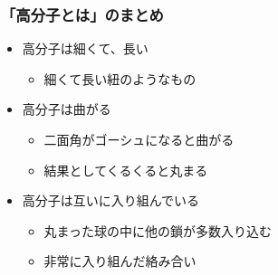\documentclass[unicode,12pt]{beamer}%
\begin{document}
\begin{frame}
	\frametitle{「高分子とは」のまとめ}
        \begin{boxnote}
            \vspace{-3mm}
            \begin{itemize}
                \item 高分子は細くて、長い
                    \begin{itemize}
                        \item 細くて長い紐のようなもの
                    \end{itemize} 
                \item 高分子は曲がる
                    \begin{itemize}
                        \item 二面角がゴーシュになると曲がる
                        \item 結果としてくるくると丸まる
                    \end{itemize} 
                \item 高分子は互いに入り組んでいる
                    \begin{itemize}
                        \item 丸まった球の中に他の鎖が多数入り込む
                        \item 非常に入り組んだ絡み合い
                    \end{itemize}
            \end{itemize}
        \end{boxnote}
\end{frame}
\end{document}
